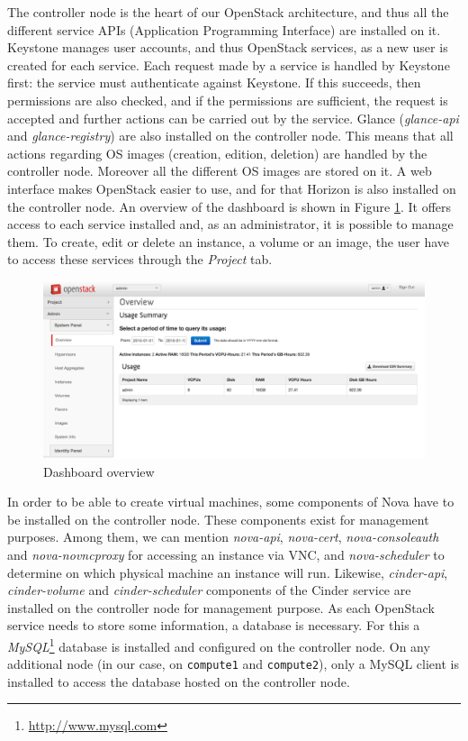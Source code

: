 The controller node is the heart of our OpenStack architecture, and thus all the different service APIs (Application Programming Interface) are installed on it. 
Keystone manages user accounts, and thus OpenStack services, as a new user is created for each service. 
Each request made by a service is handled by Keystone first: the service must authenticate against Keystone.
If this succeeds, then permissions are also checked, and if the permissions are sufficient, the request is accepted and further actions can be carried out by the service. 
Glance (\textit{glance-api} and \textit{glance-registry}) are also installed on the controller node. 
This means that all actions regarding OS images (creation, edition, deletion) are handled by the controller node.
Moreover all the different OS images are stored on it.
A web interface makes OpenStack easier to use, and for that Horizon is also installed on the controller node.
An overview of the dashboard is shown in Figure \ref{fig:dashboard}. 
It offers access to each service installed and, as an administrator, it is possible to manage them. 
To create, edit or delete an instance, a volume or an image, the user have to access these services through the \textit{Project} tab.
%
\begin{figure}[h]
	\centering
	\includegraphics[scale=0.36]{figures/dashboard.png}
	\caption{Dashboard overview}
	\label{fig:dashboard}
\end{figure}
%
In order to be able to create virtual machines, some components of Nova have to be installed on the controller node. These components exist for management purposes. 
Among them, we can mention \textit{nova-api}, \textit{nova-cert}, \textit{nova-consoleauth} and \textit{nova-novncproxy} for accessing an instance via VNC, and \textit{nova-scheduler} to determine on which physical machine an instance will run.
Likewise, \textit{cinder-api}, \textit{cinder-volume} and \textit{cinder-scheduler} components of the Cinder service are installed on the controller node for management purpose.
As each OpenStack service needs to store some information, a database is necessary. 
For this a \textit{MySQL}\footnote{\url{http://www.mysql.com}} database is installed and configured on the controller node. 
On any additional node (in our case, on \texttt{compute1} and \texttt{compute2}), only a MySQL client is installed to access the database hosted on the controller node.


